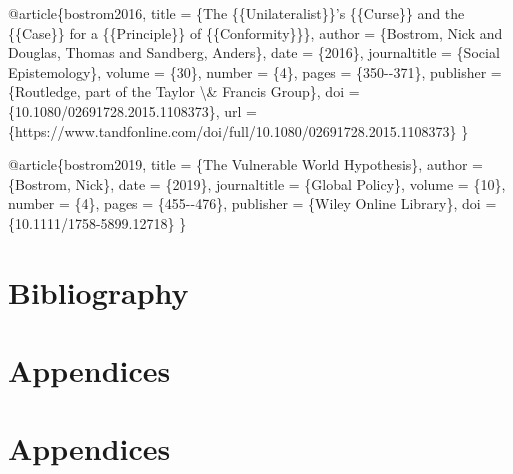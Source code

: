\documentclass[
  11pt,
  letterpaper,
]{book}
\newenvironment{Shaded}{\begin{snugshade}}{\end{snugshade}}
\newcommand{\NormalTok}[1]{\textcolor[rgb]{0.00,0.23,0.31}{#1}}
\newcommand{\SpecialCharTok}[1]{\textcolor[rgb]{0.37,0.37,0.37}{#1}}
\begin{document}
\begin{Shaded}
\begin{Highlighting}[]
\NormalTok{@article\{bostrom2016,}
\NormalTok{  title = \{The \{\{Unilateralist\}\}’s \{\{Curse\}\} and the \{\{Case\}\} for a \{\{Principle\}\} of \{\{Conformity\}\}\},}
\NormalTok{  author = \{Bostrom, Nick and Douglas, Thomas and Sandberg, Anders\},}
\NormalTok{  date = \{2016\},}
\NormalTok{  journaltitle = \{Social Epistemology\},}
\NormalTok{  volume = \{30\},}
\NormalTok{  number = \{4\},}
\NormalTok{  pages = \{350{-}{-}371\},}
\NormalTok{  publisher = \{Routledge, part of the Taylor }\SpecialCharTok{\textbackslash{}\&}\NormalTok{ Francis Group\},}
\NormalTok{  doi = \{10.1080/02691728.2015.1108373\},}
\NormalTok{  url = \{https://www.tandfonline.com/doi/full/10.1080/02691728.2015.1108373\}}
\NormalTok{\}}

\NormalTok{@article\{bostrom2019,}
\NormalTok{  title = \{The Vulnerable World Hypothesis\},}
\NormalTok{  author = \{Bostrom, Nick\},}
\NormalTok{  date = \{2019\},}
\NormalTok{  journaltitle = \{Global Policy\},}
\NormalTok{  volume = \{10\},}
\NormalTok{  number = \{4\},}
\NormalTok{  pages = \{455{-}{-}476\},}
\NormalTok{  publisher = \{Wiley Online Library\},}
\NormalTok{  doi = \{10.1111/1758{-}5899.12718\}}
\NormalTok{\}}





\end{Highlighting}
\end{Shaded}


\chapter*{Bibliography}\label{bibliography}


\printbibliography[heading=none]

\cleardoublepage
{}
{}
\appendix

\chapter{Appendices}\label{appendices-1}

\chapter*{Appendices}\label{sec-appendices}
\end{document}
